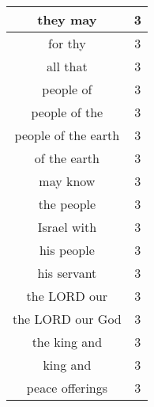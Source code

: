 \begin{center}
\begin{longtable}{|c|c|}
they may & 3\\ \hline 
for thy & 3\\ \hline 
all that & 3\\ \hline 
people of & 3\\ \hline 
people of the & 3\\ \hline 
people of the earth & 3\\ \hline 
of the earth & 3\\ \hline 
may know & 3\\ \hline 
the people & 3\\ \hline 
Israel with & 3\\ \hline 
his people & 3\\ \hline 
his servant & 3\\ \hline 
the LORD our & 3\\ \hline 
the LORD our God & 3\\ \hline 
the king and & 3\\ \hline 
king and & 3\\ \hline 
peace offerings & 3\\ \hline 
\end{longtable}
\end{center}





